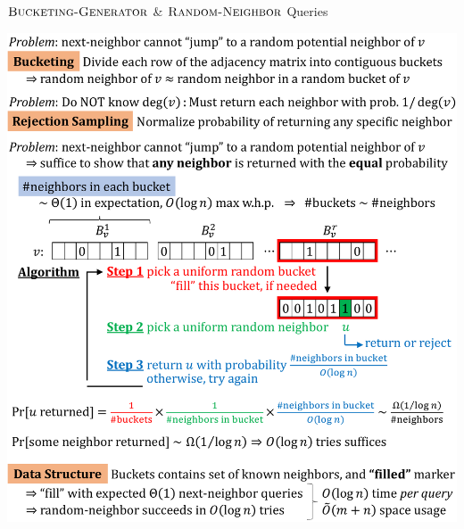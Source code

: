 \begin{block}{$\textsc{Bucketing-Generator}$ \& $\textsc{Random-Neighbor}$ Queries}

\includegraphics[clip, width=1.0\textwidth]{bucket.pdf}



\end{block}
